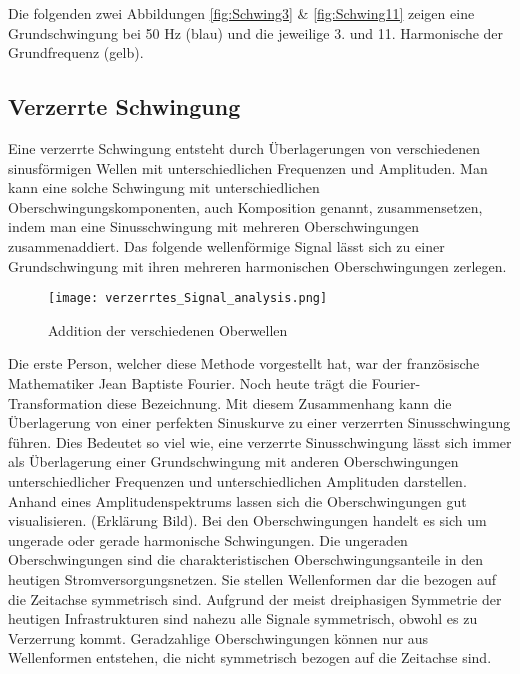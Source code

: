 Die folgenden zwei Abbildungen \ref{fig:Schwing3} \& \ref{fig:Schwing11} zeigen eine Grundschwingung bei 50 Hz (blau) und die jeweilige 3. und 11. Harmonische der Grundfrequenz (gelb).

\subsection{Verzerrte Schwingung}
Eine verzerrte Schwingung entsteht durch Überlagerungen von verschiedenen sinusförmigen Wellen mit unterschiedlichen Frequenzen und Amplituden. Man kann eine solche Schwingung mit unterschiedlichen Oberschwingungskomponenten, auch Komposition genannt, zusammensetzen, indem man eine Sinusschwingung mit mehreren Oberschwingungen zusammenaddiert. Das folgende wellenförmige Signal lässt sich zu einer Grundschwingung mit ihren mehreren harmonischen Oberschwingungen zerlegen. 

\begin{figure}[ht!]
	\centering
	\texttt{[image: verzerrtes\_Signal\_analysis.png]}	
	\caption{Addition der verschiedenen Oberwellen \cite{analysi3}}\label{fig:Addition Oberwellen}
\end{figure}


Die erste Person, welcher diese Methode vorgestellt hat, war der französische Mathematiker Jean Baptiste Fourier. Noch heute trägt die Fourier-Transformation diese Bezeichnung. Mit diesem Zusammenhang kann die Überlagerung von einer perfekten Sinuskurve zu einer verzerrten Sinusschwingung führen. Dies Bedeutet so viel wie, eine verzerrte Sinusschwingung lässt sich immer als Überlagerung einer Grundschwingung mit anderen Oberschwingungen unterschiedlicher Frequenzen und unterschiedlichen Amplituden darstellen. Anhand eines Amplitudenspektrums lassen sich die Oberschwingungen gut visualisieren. (Erklärung Bild).
Bei den Oberschwingungen handelt es sich um ungerade oder gerade harmonische Schwingungen.
Die ungeraden Oberschwingungen sind die charakteristischen Oberschwingungsanteile in den heutigen Stromversorgungsnetzen. Sie stellen Wellenformen dar die bezogen auf die Zeitachse symmetrisch sind. Aufgrund der meist dreiphasigen Symmetrie der heutigen Infrastrukturen sind nahezu alle Signale symmetrisch, obwohl es zu Verzerrung kommt. Geradzahlige Oberschwingungen können nur aus Wellenformen entstehen, die nicht symmetrisch bezogen auf die Zeitachse sind.

